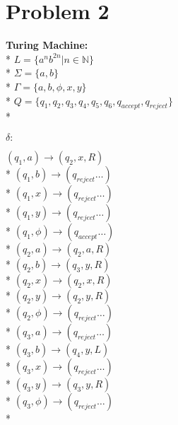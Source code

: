 \documentclass{article}
\begin{document}
\section*{Problem 2}
\begin{multicols}{3}
    \textbf{Turing Machine:} \\*
    $L=\{a^nb^{2n}|n \in \mathbb{N} \}$\\*
    $\Sigma = \{a,b\}$ \\*
    $\Gamma = \{a,b,\phi, x, y\}$ \\*
    $Q = \{q_1,q_2,q_3,q_4,q_5,q_6,q_{accept},q_{reject}\}$ \\*

    \columnbreak
    $\delta:$
    \begin{addmargin}[1em]{0em}
        $(q_1, a) \rightarrow (q_2, x, R)$\\*
        $(q_1, b) \rightarrow (q_{reject}\dots)$\\*
        $(q_1, x) \rightarrow (q_{reject}\dots)$\\*
        $(q_1, y) \rightarrow (q_{reject}\dots)$\\*
        $(q_1, \phi) \rightarrow (q_{accept}\dots)$\\*
        $(q_2, a) \rightarrow (q_2, a, R)$\\*
        $(q_2, b) \rightarrow (q_3, y, R)$\\*
        $(q_2, x) \rightarrow (q_2, x, R)$\\*
        $(q_2, y) \rightarrow (q_2, y, R)$\\*
        $(q_2, \phi) \rightarrow (q_{reject}\dots)$\\*
        $(q_3, a) \rightarrow (q_{reject}\dots)$\\*
        $(q_3, b) \rightarrow (q_4, y, L)$\\*
        $(q_3, x) \rightarrow (q_{reject}\dots)$\\*
        $(q_3, y) \rightarrow (q_3, y, R)$\\*
        $(q_3, \phi) \rightarrow (q_{reject}\dots)$\\*


\end{addmargin}
\end{multicols}
\end{document}
